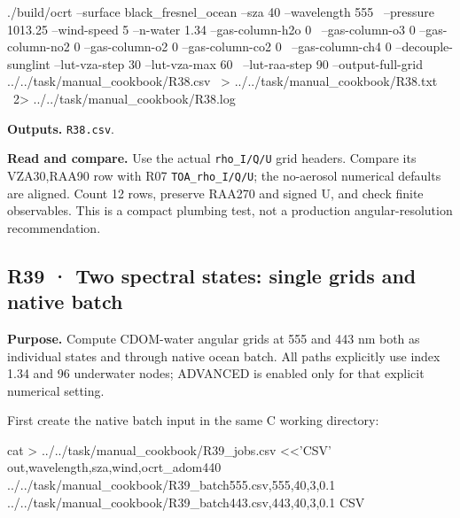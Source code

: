 \noindent\begin{minipage}{\linewidth}
\begin{ManualCode}

./build/ocrt --surface black_fresnel_ocean --sza 40 --wavelength 555 \
  --pressure 1013.25 --wind-speed 5 --n-water 1.34 --gas-column-h2o 0 \
  --gas-column-o3 0 --gas-column-no2 0 --gas-column-o2 0 --gas-column-co2 0 \
  --gas-column-ch4 0 --decouple-sunglint --lut-vza-step 30 --lut-vza-max 60 \
  --lut-raa-step 90 --output-full-grid ../../task/manual_cookbook/R38.csv \
  > ../../task/manual_cookbook/R38.txt \
  2> ../../task/manual_cookbook/R38.log

\end{ManualCode}
\end{minipage}\par

\textbf{Outputs. }\texttt{R38.csv}.

\textbf{Read and compare. }Use the actual \texttt{rho\_\allowbreak{}I/\allowbreak{}Q/\allowbreak{}U} grid headers. Compare its VZA30\textdegree{},RAA90\textdegree{} row with R07 \texttt{TOA\_\allowbreak{}rho\_\allowbreak{}I/\allowbreak{}Q/\allowbreak{}U}; the no-aerosol numerical defaults are aligned. Count 12 rows, preserve RAA270\textdegree{} and signed U, and check finite observables. This is a compact plumbing test, not a production angular-resolution recommendation.

\clearpage

\subsection{R39 · Two spectral states: single grids and native batch}
\label{sec:auto:09_cookbook:6.2}

\label{recipe:R39}

\textbf{Purpose. }Compute CDOM-water angular grids at 555 and 443 nm both as individual states and through native ocean batch. All paths explicitly use index 1.34 and 96 underwater nodes; ADVANCED is enabled only for that explicit numerical setting.

First create the native batch input in the same C working directory:

\noindent\begin{minipage}{\linewidth}
\begin{ManualCode}

cat > ../../task/manual_cookbook/R39_jobs.csv <<'CSV'
out,wavelength,sza,wind,ocrt_adom440
../../task/manual_cookbook/R39_batch555.csv,555,40,3,0.1
../../task/manual_cookbook/R39_batch443.csv,443,40,3,0.1
CSV

\end{ManualCode}
\end{minipage}\par

